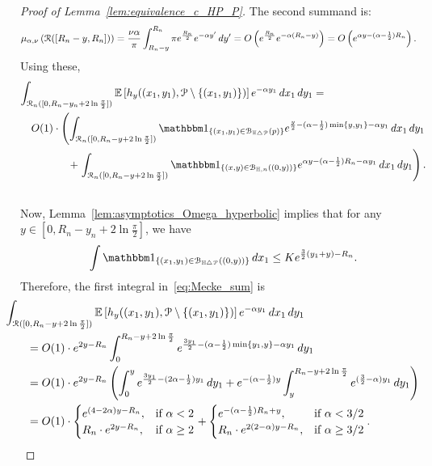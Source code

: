 \begin{proof}[Proof of Lemma~\ref{lem:equivalence_c_HP_P}]
The second summand is: 
\begin{align*}
	\mu_{\alpha,\nu} \left( {\mathcal R}([R_n - y,R_n]) \right) 
    &= \frac{\nu \alpha}{\pi} \int_{R_n - y}^{R_n} \pi e^{\frac{R_n}{2}} e^{-\alpha y'} \, dy' 
    	= O\left(e^{\frac{R_n}{2}} e^{-\alpha (R_n-y)}\right) = O\left(e^{\alpha y - (\alpha - \frac{1}{2})R_n}\right). 
\end{align*}
Using these, 
\begin{eqnarray} 
	\lefteqn{\int_{\Rcal_n ([0, R_n - y_n + 2 \ln \frac{\pi}{2}])} \Exp{h_y((x_1,y_1), \Pcal \setminus \{(x_1,y_1)\})} 
    e^{-\alpha y_1} \, dx_1 \, dy_1 =}  \nonumber \\
	& & O(1) \cdot \left(\int_{\Rcal_n ([0, R_n - y+ 2 \ln \frac{\pi}{2}])} \ind{(x_1,y_1) \in \BallSym{p}} 		e^{\frac{y}{2} - (\alpha - \frac{1}{2}) \min \{y,y_1\} - \alpha y_1} \, dx_1 \, dy_1 \right.  \nonumber \\ 
	& & \hspace{1cm}+\left. \int_{\Rcal_n ([0, R_n - y + 2 \ln \frac{\pi}{2}])} 
    	\ind{(x,y) \in \BallHyp{(0,y)}} 
    	e^{\alpha y - (\alpha - \frac{1}{2})R_n - \alpha y_1} \, dx_1 \, dy_1\right). \nonumber \\
	& &\label{eq:Mecke_sum}
\end{eqnarray}
Now, Lemma~\ref{lem:asymptotics_Omega_hyperbolic} implies that 
for any $y \in [0, R_n - y_n + 2 \ln \frac{\pi}{2}]$, we have 
\[ 
	\int \ind{(x_1,y_1) \in \BallSym{(0,y)}} \, dx_1 \leq K e^{\frac{3}{2} (y_1 + y) - R_n}.
\]
Therefore, the first integral in~\eqref{eq:Mecke_sum} is 
\begin{align*}
	&\hspace{-20pt}\int_{\Rcal ([0, R_n - y + 2 \ln \frac{\pi}{2}])} \Exp{h_y((x_1,y_1), \Pcal \setminus \{(x_1,y_1)\})} 
    	e^{-\alpha y_1} \, dx_1 \, dy_1 \\
	&= O(1) \cdot e^{2 y - R_n} \int_{0}^{R_n - y + 2 \ln \frac{\pi}{2}} 
    	e^{\frac{3y_1}{2} - (\alpha - \frac{1}{2})\min\{y_1,y\} - \alpha y_1} \, dy_1 \\
 	&=  O(1) \cdot e^{2 y - R_n} \left( \int_{0}^{y} e^{\frac{3y_1}{2} - (2\alpha - \frac{1}{2})y_1} \, dy_1 
 		+ e^{-(\alpha-\frac{1}{2}) y}\int_{y}^{R_n - y + 2 \ln \frac{\pi}{2}} e^{(\frac{3}{2} - \alpha) y_1} \, dy_1 \right)\\
  	&= O(1) \cdot 
	\begin{cases}
	e^{(4-2\alpha) y - R_n}, & \mbox{if $\alpha < 2$} \\
	R_n \cdot e^{2y - R_n}, & \mbox{if $\alpha \geq 2$}
	\end{cases}
	+
	\begin{cases}
	e^{-(\alpha - \frac{1}{2})R_n +y}, & \mbox{if $\alpha < 3/2$} \\
	R_n \cdot  e^{2(2-\alpha)y - R_n}, & \mbox{if $\alpha \geq 3/2$}
	\end{cases}.
\end{align*}


\end{proof}
